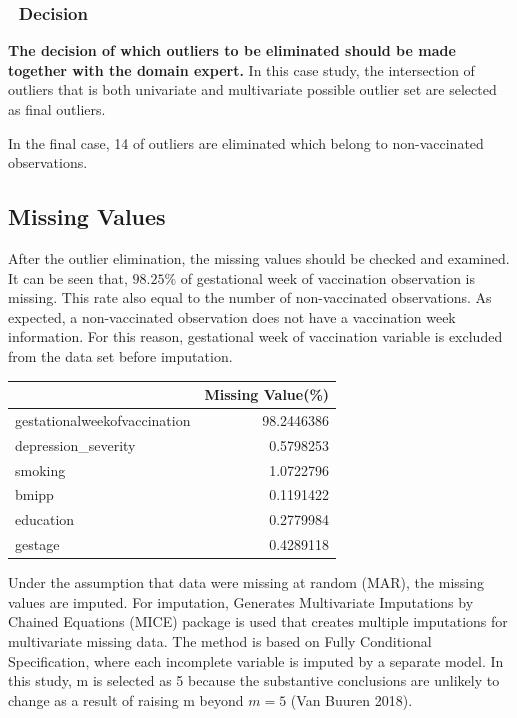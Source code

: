 \documentclass[
]{article}
\begin{document}
\hypertarget{decision}{%
\subsubsection{🎯 Decision}\label{decision}}

\textbf{The decision of which outliers to be eliminated should be made
together with the domain expert.} In this case study, the intersection
of outliers that is both univariate and multivariate possible outlier
set are selected as final outliers.

In the final case, 14 of outliers are eliminated which belong to
non-vaccinated observations.

\hypertarget{missing-values}{%
\subsection{Missing Values}\label{missing-values}}

After the outlier elimination, the missing values should be checked and
examined. It can be seen that, \(98.25\%\) of gestational week of
vaccination observation is missing. This rate also equal to the number
of non-vaccinated observations. As expected, a non-vaccinated
observation does not have a vaccination week information. For this
reason, gestational week of vaccination variable is excluded from the
data set before imputation.

\begin{table}
\begin{tabular}[t]{l|r}
\hline
  & Missing Value(\%)\\
\hline
gestationalweekofvaccination & 98.2446386\\
\hline
depression\_severity & 0.5798253\\
\hline
smoking & 1.0722796\\
\hline
bmipp & 0.1191422\\
\hline
education & 0.2779984\\
\hline
gestage & 0.4289118\\
\hline
\end{tabular}\end{table}

Under the assumption that data were missing at random (MAR), the missing
values are imputed. For imputation, Generates Multivariate Imputations
by Chained Equations (MICE) package is used that creates multiple
imputations for multivariate missing data. The method is based on Fully
Conditional Specification, where each incomplete variable is imputed by
a separate model. In this study, m is selected as 5 because the
substantive conclusions are unlikely to change as a result of raising m
beyond \(m=5\) (Van Buuren 2018).
\end{document}
